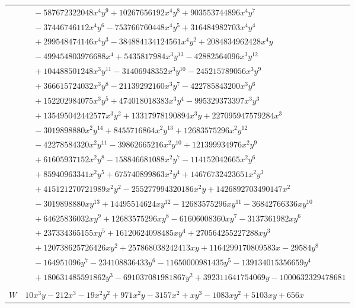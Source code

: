\documentclass[11pt]{article}
\begin{document}
\begin{longtable}{@{}ll@{}}
 & $\quad -587672322048x^{4}y^{9}+10267656192x^{4}y^{8}+903553744896x^{4}y^{7}$\\
 & $\quad -37446746112x^{4}y^{6}-753766760448x^{4}y^{5}+316484982703x^{4}y^{4}$\\
 & $\quad +299548474146x^{4}y^{3}-384884134124561x^{4}y^{2}+2084834962428x^{4}y$\\
 & $\quad -499454803976688x^{4}+5435817984x^{3}y^{13}-42882564096x^{3}y^{12}$\\
 & $\quad +104488501248x^{3}y^{11}-31406948352x^{3}y^{10}-245215789056x^{3}y^{9}$\\
 & $\quad +366615724032x^{3}y^{8}-21139292160x^{3}y^{7}-422785843200x^{3}y^{6}$\\
 & $\quad +152202984075x^{3}y^{5}+474018018383x^{3}y^{4}-995329373397x^{3}y^{3}$\\
 & $\quad +135495042442577x^{3}y^{2}+13317978190894x^{3}y+227095947579284x^{3}$\\
 & $\quad -3019898880x^{2}y^{14}+8455716864x^{2}y^{13}+12683575296x^{2}y^{12}$\\
 & $\quad -42278584320x^{2}y^{11}-39862665216x^{2}y^{10}+121399934976x^{2}y^{9}$\\
 & $\quad +61605937152x^{2}y^{8}-158846681088x^{2}y^{7}-114152042665x^{2}y^{6}$\\
 & $\quad +85940963341x^{2}y^{5}+675740899863x^{2}y^{4}+14676732423651x^{2}y^{3}$\\
 & $\quad +415121270721989x^{2}y^{2}-255277994320186x^{2}y+1426892703490147x^{2}$\\
 & $\quad -3019898880xy^{13}+14495514624xy^{12}-12683575296xy^{11}-36842766336xy^{10}$\\
 & $\quad +64625836032xy^{9}+12683575296xy^{8}-61606008360xy^{7}-3137361982xy^{6}$\\
 & $\quad +237334365155xy^{5}+16120624098485xy^{4}+270564255227288xy^{3}$\\
 & $\quad +120738625726426xy^{2}+257868038242413xy+1164299170809583x-29584y^{8}$\\
 & $\quad -164951096y^{7}-234108836433y^{6}-11650000981435y^{5}-139134015356659y^{4}$\\
 & $\quad +180631485591862y^{3}-691037081981867y^{2}+392311641754069y-1000632329478681$\\
\addlinespace[3pt]
\multicolumn{2}{@{}l}{$i=4$, $m=12$, neighbours $0,36,49,93,132,147,148,149,206$}\\
$W$ & $10x^{3}y-212x^{3}-19x^{2}y^{2}+971x^{2}y-3157x^{2}+xy^{3}-1083xy^{2}+5103xy+656x$\\

\end{longtable}
\end{document}
